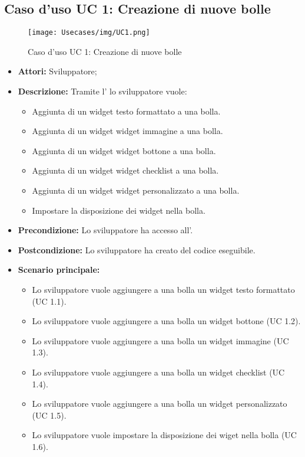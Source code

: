 \newpage
\subsection{Caso d'uso UC 1: Creazione di nuove bolle}
\label{Caso d'uso UC 1: Creazione di nuove bolle}
\begin{figure}[ht]
	\centering
	\texttt{[image: Usecases/img/UC1.png]}
	\caption{Caso d'uso UC 1: Creazione di nuove bolle}
\end{figure}

\FloatBarrier
\begin{itemize}
\item \textbf{Attori:} Sviluppatore;
\item \textbf{Descrizione:} Tramite l' lo sviluppatore vuole:
	\begin{itemize}
	\item{Aggiunta di un widget testo formattato a una bolla.} 
	\item{Aggiunta di un widget widget immagine a una bolla.}
	\item{Aggiunta di un widget widget bottone a una bolla.}
	\item{Aggiunta di un widget widget checklist a una bolla.}
	\item{Aggiunta di un widget widget personalizzato a una bolla.}
	\item{Impostare la disposizione dei widget nella bolla.}
	\end{itemize} 
\item \textbf{Precondizione:} Lo sviluppatore ha accesso all'.
\item \textbf{Postcondizione:} Lo sviluppatore ha creato del codice eseguibile. 
\item \textbf{Scenario principale:}
	\begin{itemize}
	\item{Lo sviluppatore vuole aggiungere a una bolla un widget testo formattato (UC 1.1).}
	\item{Lo sviluppatore vuole aggiungere a una bolla un widget bottone (UC 1.2).}
	\item{Lo sviluppatore vuole aggiungere a una bolla un widget immagine (UC 1.3).}
	\item{Lo sviluppatore vuole aggiungere a una bolla un widget checklist (UC 1.4).}
	\item{Lo sviluppatore vuole aggiungere a una bolla un widget personalizzato (UC 1.5).}
	\item{Lo sviluppatore vuole impostare la disposizione dei wiget nella bolla (UC 1.6).}
	\end{itemize}
\end{itemize}